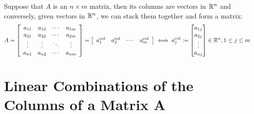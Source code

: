 \documentclass[letterpaper]{book}
\begin{document}
\begin{tcolorbox}[sharp corners, colback=green!30, colframe=green!80!blue,
title=\textbf{\Large Columns of Matrices are Vectors and Vice Versa}]
Suppose that $A$ is an $n\times m$ matrix, then its columns are vectors in $\mathbb R^n$ and conversely, given vectors in $\mathbb R^n$, we can stack them together and form a matrix:
\begin{equation}
\label{eq:ColumnsOfMatrixVectorsRn}
    A =  \left[\begin{array}{cccc} a_{11}& a_{12}& \cdots & a_{1m} \\
 a_{21}& a_{22}& \cdots & a_{2m}  \\
 \vdots & \vdots&  \ddots & \vdots \\
 a_{n1}& a_{n2}& \cdots & a_{nm} 
 \end{array}\right] =
\left[\begin{array}{cccc} a_1^{\rm col} & a_2^{\rm col} & \cdots & a_m^{\rm col}\end{array}\right]  \iff a_j^{\rm col}:=\begin{bmatrix} a_{1j} \\ a_{2j}  \\ \vdots \\ a_{nj} \end{bmatrix} \in \mathbb R^n, 1 \le j \le m
\end{equation}
\end{tcolorbox}


\section{Linear Combinations of the Columns of a Matrix A}
\end{document}

